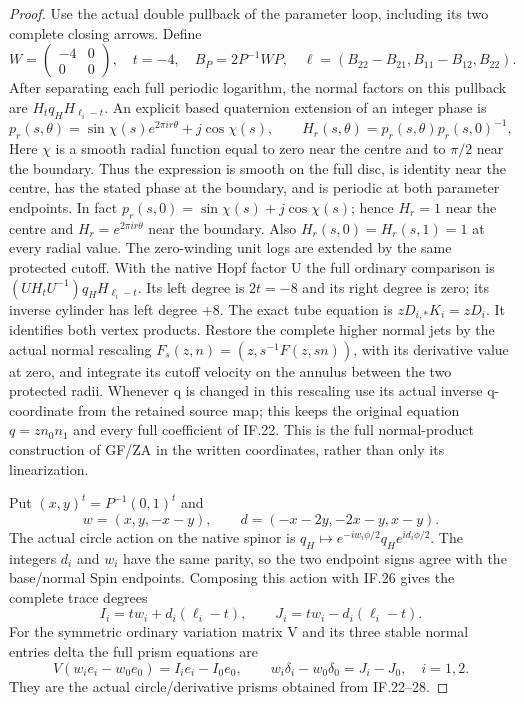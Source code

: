 \begin{proof}
Use the actual double pullback of the parameter loop, including its
two complete closing arrows.  Define
\[
 W=\begin{pmatrix}-4&0\\0&0\end{pmatrix},\quad t=-4,\quad
 B_P=2P^{-1}WP,\quad
 \ell=(B_{22}-B_{21},B_{11}-B_{12},B_{22}).
 \tag{IF.25}
\]
After separating each full periodic logarithm, the normal factors on
this pullback are \(H_tq_HH_{\ell_i-t}\).  An explicit based
quaternion extension of an integer phase is
\[
 p_r(s,\theta)=\sin\chi(s)e^{2\pi i r\theta}+j\cos\chi(s),\qquad
 H_r(s,\theta)=p_r(s,\theta)p_r(s,0)^{-1},
 \tag{IF.26}
\]
Here \(\chi\) is a smooth radial function equal to zero near the
centre and to \(\pi/2\) near the boundary.  Thus the expression is
smooth on the full disc, is identity near the centre, has the stated
phase at the boundary, and is periodic at both parameter endpoints.
In fact \(p_r(s,0)=\sin\chi(s)+j\cos\chi(s)\); hence
\(H_r=1\) near the centre and
\(H_r=e^{2\pi i r\theta}\) near the boundary.  Also
\(H_r(s,0)=H_r(s,1)=1\) at every radial value.
The zero-winding unit
logs are extended by the same protected cutoff.  With the native
Hopf factor U the full ordinary comparison is
\((UH_tU^{-1})q_HH_{\ell_i-t}\).  Its left degree is
\(2t=-8\) and its right degree is zero; its inverse cylinder has
left degree +8.  The exact tube equation is
\(zD_{i,*}K_i=zD_i\).  It identifies both vertex products.  Restore
the complete higher normal jets by the actual normal rescaling
\(F_s(z,n)=(z,s^{-1}F(z,sn))\), with its derivative value at zero,
and integrate its cutoff velocity on the annulus between the two
protected radii.  Whenever q is changed in this rescaling use its
actual inverse q-coordinate from the retained source map; this keeps
the original equation \(q=zn_0n_1\) and every full coefficient of IF.22.
This is the full normal-product construction of GF/ZA in the written
coordinates, rather than only its linearization.

Put \((x,y)^t=P^{-1}(0,1)^t\) and
\[
 w=(x,y,-x-y),\qquad d=(-x-2y,-2x-y,x-y).
 \tag{IF.27}
\]
The actual circle action on the native spinor is
\(q_H\mapsto e^{-iw_i\phi/2}q_H e^{id_i\phi/2}\).
The integers \(d_i\) and \(w_i\) have the same parity, so the two endpoint
signs agree with the base/normal Spin endpoints.  Composing this
action with IF.26 gives the complete trace degrees
\[
 I_i=t w_i+d_i(\ell_i-t),\qquad
 J_i=t w_i-d_i(\ell_i-t).
 \tag{IF.28}
\]
For the symmetric ordinary variation matrix V and its three stable
normal entries delta the full prism equations are
\[
 V(w_i e_i-w_0e_0)=I_i e_i-I_0e_0,\qquad
 w_i\delta_i-w_0\delta_0=J_i-J_0,\quad i=1,2.
 \tag{IF.29}
\]
They are the actual circle/derivative prisms obtained from IF.22--28.


\end{proof}
